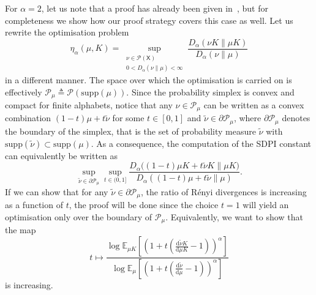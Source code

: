 \documentclass[conference,letterpaper]{IEEEtran}
\def \X{\mathsf X}
\def \calP{\mathcal P}
\def \supp {\mathrm{supp}}
\newcommand{\renyiDiv}[2]{D_{\alpha}\left(#1\|#2\right)}
\newcommand{\dd}[1]{\mathrm{d}#1}
\newcommand{\mean}[2]{\mathbb{E}_{#1}\left[#2\right]}
\begin{document}
    \begin{IEEEproof}
    For $\alpha=2$, let us note that a proof has already been given in~\cite{jin2024properties}, but for completeness we show how our proof strategy covers this case as well. Let us rewrite the optimisation problem
    \begin{equation*}
        \eta_\alpha(\mu, K) = \sup_{\substack{\nu\in\calP(\X)\\0<\renyiDiv{\nu}{\mu}<\infty}}\frac{\renyiDiv{\nu K}{\mu K}}{\renyiDiv{\nu}{\mu}}
    \end{equation*}
    in a different manner. The space over which the optimisation is carried on is effectively ${\calP_\mu\triangleq \calP(\supp(\mu))}$. Since the probability simplex is convex and compact for finite alphabets, notice that any $\nu\in\calP_\mu$ can be written as a convex combination $(1-t)\mu+t\tilde{\nu}$ for some $t\in[0,1]$ and $\tilde{\nu}\in\partial\calP_\mu$, where $\partial\calP_\mu$ denotes the boundary of the simplex, that is the set of probability measure $\tilde{\nu}$ with $\supp(\tilde{\nu})\subset\supp(\mu)$. As a consequence, the computation of the SDPI constant can equivalently be written as
    \begin{equation*}
    \sup_{\tilde{\nu}\in\partial\calP_\mu}\sup_{t\in(0,1]}\frac{D_\alpha\big((1-t)\mu K+t\tilde{\nu}K\|\mu K\big)}{D_\alpha((1-t)\mu+t\tilde{\nu}\|\mu)}.
    \end{equation*}
    If we can show that for any $\tilde{\nu}\in\partial\calP_\mu$, the ratio of R\'enyi divergences is increasing as a function of $t$, the proof will be done since the choice $t=1$ will yield an optimisation only over the boundary of $\calP_\mu$. Equivalently, we want to show that the map
    \begin{equation}\label{eq:function_to_show_monotonicity_of}
        t\mapsto\frac{\log\mean{\mu K}{\left(1 + t\left(\frac{\dd\tilde{\nu}K}{\dd\mu K}-1\right)\right)^\alpha}}{\log\mean{\mu}{\left(1 + t\left(\frac{\dd\tilde{\nu}}{\dd\mu }-1\right)\right)^\alpha}}
    \end{equation}
    is increasing. 
    

\end{IEEEproof}
\end{document}
